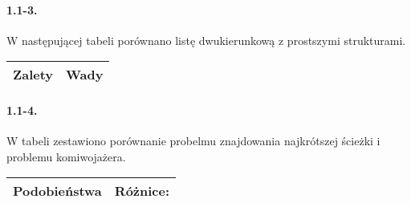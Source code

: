 \paragraph{1.1-3.}
W następującej tabeli porównano listę dwukierunkową z prostszymi strukturami.\\
\begin{tabular}{l|l}
Zalety & Wady \\
\hline
\end{tabular}

\paragraph{1.1-4.}
W tabeli zestawiono porównanie probelmu znajdowania najkrótszej ścieżki i problemu komiwojażera.
\begin{tabular}{l|l}
Podobieństwa & Różnice: \\
\hline
\end{tabular}

